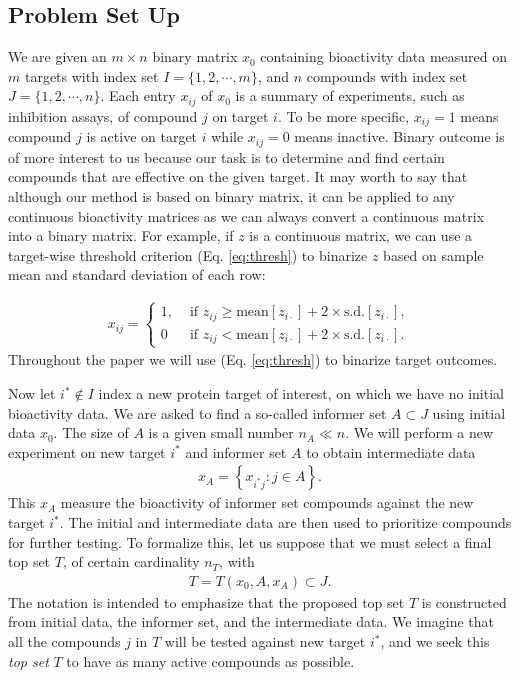 \documentclass[12pt]{article}
\begin{document}
\subsection{Problem Set Up}

We are given an $m \times n$ binary matrix $x_0$ containing bioactivity data measured on $m$ targets with index set $I = \{1,2,\cdots,m\}$, and $n$ compounds with index set $J=\{1,2,\cdots,n\}$.  Each entry $x_{ij}$ of $x_0$ is a summary of experiments, such as inhibition assays,
of compound $j$ on target $i$. To be more specific, $x_{ij} = 1$ means compound $j$ is active on target $i$ while $x_{ij} = 0$ means inactive. Binary outcome is of more interest to us because our task is to determine and find certain compounds that are effective on the given target. It may worth to say that although our method is based on binary matrix, it can be applied to any continuous bioactivity matrices as we can always convert a continuous matrix into a binary matrix. For example, if $z$ is a continuous matrix, we can use a target-wise threshold criterion (Eq. \ref{eq:thresh}) to binarize $z$ based on sample mean and standard deviation of each row:

\begin{eqnarray}
\label{eq:thresh}
x_{ij} = \begin{cases}
		1, &\text{ if }
	      z_{ij} \geq \mbox{mean}[z_{i\cdot}] + 2 \times \mbox{s.d.}[z_{i\cdot}],\\
		0 & \text{ if }
	      z_{ij} < \mbox{mean}[z_{i\cdot}] + 2 \times \mbox{s.d.}[z_{i\cdot}].
	\end{cases}
\end{eqnarray}
Throughout the paper we will use (Eq. \ref{eq:thresh}) to binarize target outcomes.  

Now let $i^* \notin I$ index a new protein target of interest, on which we have no initial bioactivity data.   
We are asked to find a so-called informer set $A \subset J$ using initial data $x_0$. The size of $A$ is a
given small number $n_A \ll n$. We will perform
a new experiment on new target $i^*$ and informer set $A$ to obtain intermediate data 
\begin{eqnarray*}
x_{A} = \left\{ x_{i^*j}: j \in A \right\}.
\end{eqnarray*}
This $x_A$ measure the bioactivity of informer
set compounds against the new target $i^*$.  The initial and intermediate
data are then used to prioritize compounds for further testing.
To formalize this, let us suppose that we must select a final
top set $T$, of certain cardinality $n_T$, with
\begin{eqnarray*}
T = T\left( x_0, A, x_A \right) \subset J.
\end{eqnarray*}
The notation is intended to emphasize that the proposed top set $T$ is constructed
from initial data, the informer set, and the intermediate data.
We imagine that all the compounds $j$ in $T$ will be
tested against new target $i^*$, and we seek this  {\em top set} $T$ to have as many
active compounds as possible.
\end{document}
